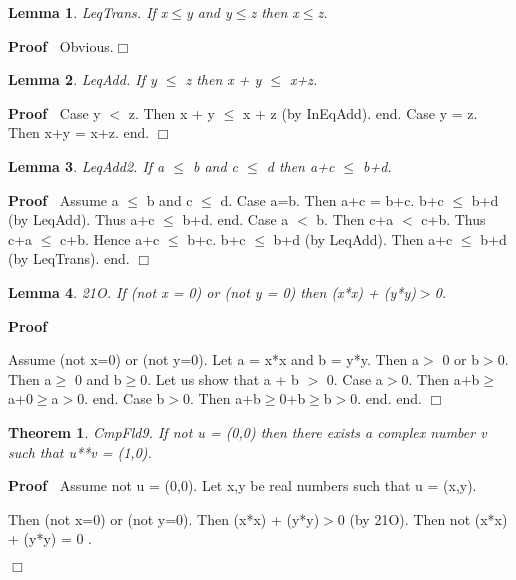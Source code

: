 \documentclass{article}
\newenvironment{forthel}{\begin{leftbar}}{\end{leftbar}}
\newenvironment{proof}{\noindent\textbf{Proof\ }}{\hspace*{\fill}$\Box$\medskip}
\newtheorem{lemma}{Lemma}
\newtheorem{theorem}{Theorem}
\begin{document}
\begin{forthel}
\begin{lemma} LeqTrans. If x$\leq$y and y$\leq$z then x$\leq$z.

\end{lemma}
\begin{proof}
 	Obvious.\end{proof}



\begin{lemma} LeqAdd. 	If y $\leq$ z then x + y $\leq$ x+z.

\end{lemma}
\begin{proof}
			Case y $<$ z. Then x + y $\leq$ x + z (by InEqAdd). end.
Case y = z. Then x+y = x+z. end.
\end{proof}


\begin{lemma} LeqAdd2.  If a $\leq$ b and c $\leq$ d then a+c $\leq$ b+d.

\end{lemma}
\begin{proof}
			Assume a $\leq$ b and c $\leq$ d. 
Case a=b. Then a+c = b+c. b+c $\leq$ b+d (by LeqAdd). Thus a+c $\leq$ b+d. end.
Case a $<$ b. Then c+a $<$ c+b. Thus c+a $\leq$ c+b. Hence a+c $\leq$ b+c. b+c $\leq$ b+d (by LeqAdd).
Then a+c $\leq$ b+d (by LeqTrans). end.
\end{proof}



\begin{lemma} 21O. If (not x = 0) or (not y = 0) then (x*x) + (y*y)$>$0.

\end{lemma}
\begin{proof}
 
Assume (not x=0) or (not y=0).
Let a = x*x and b = y*y.
Then a$>$ 0 or b$>$0.
Then a$\geq$ 0 and b$\geq$0.
Let us show that a + b $>$ 0.
Case a$>$0. Then a+b$\geq$a+0$\geq$a$>$0. end.
Case b$>$0. Then a+b$\geq$0+b$\geq$b$>$0. end.
end.
\end{proof}


\begin{theorem}
 CmpFld9. If not u = (0,0) then there exists a complex number v such that u**v = (1,0).
\end{theorem}\begin{proof}
 Assume not u = (0,0).
Let x,y be real numbers such that u = (x,y).

Then (not x=0) or (not y=0).
Then (x*x) + (y*y)$>$0 (by 21O).
Then not (x*x) + (y*y) = 0 .


\end{proof}
\end{forthel}
\end{document}
